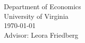\begin{titlepage}
\maketitle
    \thispagestyle{empty}
    \vfill
\small{
\noindent Department of Economics \vspace{0em} \\
\noindent University of Virginia \vspace{0em} \\
\noindent \usdate\today \vspace{0em} \\
\noindent Advisor: Leora Friedberg
}
\end{titlepage}
    \setcounter{page}{1} %
\begin{comment}
    \begin{center}
        \LARGE{
        The Impact of the Hyde Amendment \\
        on Education Outcomes of the Marginal Child
        } \vspace{1em} \\
        \large{\textit{Trevor S. Jordan}} \vspace{1em} \\
        \large{\textit{Spring 2017}}
    \end{center}
        \vspace{15em}
    \noindent\textit{Abstract}: \ldots
        \vfill
    \noindent\textbf{Acknowledgements}: \ldots
\end{comment}
        \newpage
